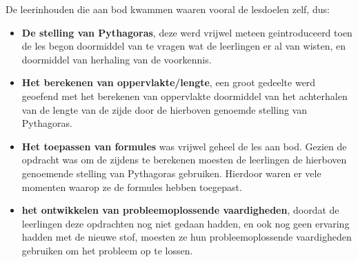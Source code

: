 \documentclass{article}
\begin{document}
\begin{enumerate}[label=(\alph*)]
                    De leerinhouden die aan bod kwammen waaren vooral de lesdoelen zelf, dus:
                    \begin{itemize}
                        \item \textbf{De stelling van Pythagoras}, deze werd vrijwel meteen geintroduceerd toen de les begon doormiddel van te vragen wat de leerlingen er al van wisten, en doormiddel van herhaling van de voorkennis.
                        \item \textbf{Het berekenen van oppervlakte/lengte}, een groot gedeelte werd geoefend met het berekenen van oppervlakte doormiddel van het achterhalen van de lengte van de zijde door de hierboven genoemde stelling van Pythagoras.
                        \item \textbf{Het toepassen van formules} was vrijwel geheel de les aan bod. Gezien de opdracht was om de zijdens te berekenen moesten de leerlingen de hierboven genoemende stelling van Pythagoras gebruiken. Hierdoor waren er vele momenten waarop ze de formules hebben toegepast.
                        \item \textbf{het ontwikkelen van probleemoplossende vaardigheden}, doordat de leerlingen deze opdrachten nog niet gedaan hadden, en ook nog geen ervaring hadden met de nieuwe stof, moesten ze hun probleemoplossende vaardigheden gebruiken om het probleem op te lossen.
                    \end{itemize}
                    
            \end{enumerate}
        \newpage
\end{document}
